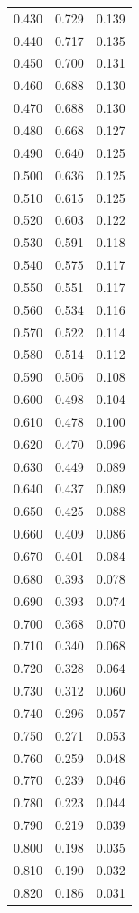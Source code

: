\begin{tabular}{rrr}
0.430 & 0.729 & 0.139 \\
0.440 & 0.717 & 0.135 \\
0.450 & 0.700 & 0.131 \\
0.460 & 0.688 & 0.130 \\
0.470 & 0.688 & 0.130 \\
0.480 & 0.668 & 0.127 \\
0.490 & 0.640 & 0.125 \\
0.500 & 0.636 & 0.125 \\
0.510 & 0.615 & 0.125 \\
0.520 & 0.603 & 0.122 \\
0.530 & 0.591 & 0.118 \\
0.540 & 0.575 & 0.117 \\
0.550 & 0.551 & 0.117 \\
0.560 & 0.534 & 0.116 \\
0.570 & 0.522 & 0.114 \\
0.580 & 0.514 & 0.112 \\
0.590 & 0.506 & 0.108 \\
0.600 & 0.498 & 0.104 \\
0.610 & 0.478 & 0.100 \\
0.620 & 0.470 & 0.096 \\
0.630 & 0.449 & 0.089 \\
0.640 & 0.437 & 0.089 \\
0.650 & 0.425 & 0.088 \\
0.660 & 0.409 & 0.086 \\
0.670 & 0.401 & 0.084 \\
0.680 & 0.393 & 0.078 \\
0.690 & 0.393 & 0.074 \\
0.700 & 0.368 & 0.070 \\
0.710 & 0.340 & 0.068 \\
0.720 & 0.328 & 0.064 \\
0.730 & 0.312 & 0.060 \\
0.740 & 0.296 & 0.057 \\
0.750 & 0.271 & 0.053 \\
0.760 & 0.259 & 0.048 \\
0.770 & 0.239 & 0.046 \\
0.780 & 0.223 & 0.044 \\
0.790 & 0.219 & 0.039 \\
0.800 & 0.198 & 0.035 \\
0.810 & 0.190 & 0.032 \\
0.820 & 0.186 & 0.031 \\

\end{tabular}
